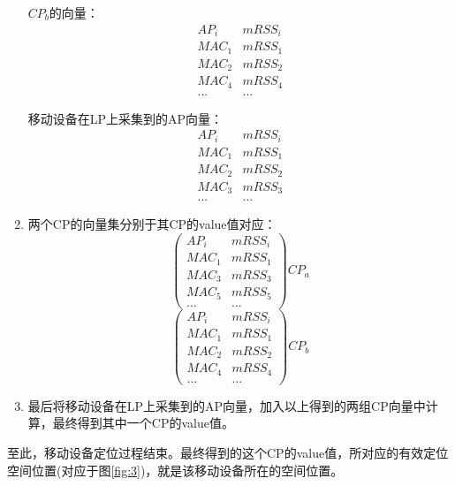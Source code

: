 \documentclass[UTF8, twocolumn ]{ctexart}
\begin{document}
\begin{enumerate}
\begin{displaymath}
  \end{displaymath}
  \par
  $CP_{b}$的向量：
  \begin{displaymath}
    \begin{array}{c|c}
      AP_{i} & mRSS_{i} \\ \hline
      MAC_{1} & mRSS_{1} \\
      MAC_{2} & mRSS_{2} \\
      MAC_{4} & mRSS_{4} \\
      ... & ...
    \end{array}
  \end{displaymath}
  \par
  移动设备在LP上采集到的AP向量：
  \begin{displaymath}
    \begin{array}{c|c}
      AP_{i} & mRSS_{i} \\ \hline
      MAC_{1} & mRSS_{1} \\
      MAC_{2} & mRSS_{2} \\
      MAC_{3} & mRSS_{3} \\
      ... & ...
    \end{array}
  \end{displaymath}
\item 两个CP的向量集分别于其CP的value值对应：
  \begin{displaymath}
    \left(
    \begin{array}{c|c}
      AP_{i} & mRSS_{i} \\ \hline
      MAC_{1} & mRSS_{1} \\
      MAC_{3} & mRSS_{3} \\
      MAC_{5} & mRSS_{5} \\
      ... & ...
    \end{array}
    \right)CP_{a}
  \end{displaymath}
  \begin{displaymath}
    \left(
    \begin{array}{c|c}
      AP_{i} & mRSS_{i} \\ \hline
      MAC_{1} & mRSS_{1} \\
      MAC_{2} & mRSS_{2} \\
      MAC_{4} & mRSS_{4} \\
      ... & ...
    \end{array}
    \right)CP_{b}
  \end{displaymath}
\item 最后将移动设备在LP上采集到的AP向量，加入以上得到的两组CP向量中计算，最终得到其中一个CP的value值。
\end{enumerate}
\par
至此，移动设备定位过程结束。最终得到的这个CP的value值，所对应的有效定位空间位置(对应于图\ref{fig:3})，就是该移动设备所在的空间位置。
\end{document}

